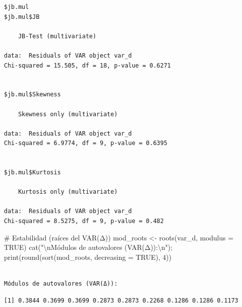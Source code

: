 \documentclass[
  spanish,
  letterpaper,
  DIV=11,
  numbers=noendperiod]{scrartcl}
\newenvironment{Shaded}{\begin{snugshade}}{\end{snugshade}}
\newcommand{\AttributeTok}[1]{\textcolor[rgb]{0.40,0.45,0.13}{#1}}
\newcommand{\CommentTok}[1]{\textcolor[rgb]{0.37,0.37,0.37}{#1}}
\newcommand{\ConstantTok}[1]{\textcolor[rgb]{0.56,0.35,0.01}{#1}}
\newcommand{\DecValTok}[1]{\textcolor[rgb]{0.68,0.00,0.00}{#1}}
\newcommand{\FunctionTok}[1]{\textcolor[rgb]{0.28,0.35,0.67}{#1}}
\newcommand{\NormalTok}[1]{\textcolor[rgb]{0.00,0.23,0.31}{#1}}
\newcommand{\OtherTok}[1]{\textcolor[rgb]{0.00,0.23,0.31}{#1}}
\newcommand{\SpecialCharTok}[1]{\textcolor[rgb]{0.37,0.37,0.37}{#1}}
\newcommand{\StringTok}[1]{\textcolor[rgb]{0.13,0.47,0.30}{#1}}
\begin{document}
\begin{verbatim}
$jb.mul
$jb.mul$JB

    JB-Test (multivariate)

data:  Residuals of VAR object var_d
Chi-squared = 15.505, df = 18, p-value = 0.6271


$jb.mul$Skewness

    Skewness only (multivariate)

data:  Residuals of VAR object var_d
Chi-squared = 6.9774, df = 9, p-value = 0.6395


$jb.mul$Kurtosis

    Kurtosis only (multivariate)

data:  Residuals of VAR object var_d
Chi-squared = 8.5275, df = 9, p-value = 0.482
\end{verbatim}

\begin{Shaded}
\begin{Highlighting}[]
\CommentTok{\# Estabilidad (raíces del VAR(Δ))}
\NormalTok{mod\_roots }\OtherTok{\textless{}{-}} \FunctionTok{roots}\NormalTok{(var\_d, }\AttributeTok{modulus =} \ConstantTok{TRUE}\NormalTok{)}
\FunctionTok{cat}\NormalTok{(}\StringTok{"}\SpecialCharTok{\textbackslash{}n}\StringTok{Módulos de autovalores (VAR(Δ)):}\SpecialCharTok{\textbackslash{}n}\StringTok{"}\NormalTok{); }\FunctionTok{print}\NormalTok{(}\FunctionTok{round}\NormalTok{(}\FunctionTok{sort}\NormalTok{(mod\_roots, }\AttributeTok{decreasing =} \ConstantTok{TRUE}\NormalTok{), }\DecValTok{4}\NormalTok{))}
\end{Highlighting}
\end{Shaded}

\begin{verbatim}

Módulos de autovalores (VAR(Δ)):
\end{verbatim}

\begin{verbatim}
[1] 0.3844 0.3699 0.3699 0.2873 0.2873 0.2268 0.1286 0.1286 0.1173
\end{verbatim}
\end{document}
